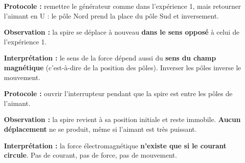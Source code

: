 \documentclass[11pt]{article}
\begin{document}
\begin{experience}
\textbf{Protocole :} remettre le générateur comme dans l'expérience 1, mais retourner l'aimant en U : le pôle Nord prend la place du pôle Sud et inversement.

\textbf{Observation :} la spire se déplace à nouveau \textbf{dans le sens opposé} à celui de l'expérience 1.

\textbf{Interprétation :} le sens de la force dépend aussi du \textbf{sens du champ magnétique} (c'est-à-dire de la position des pôles). Inverser les pôles inverse le mouvement.
\end{experience}

\begin{experience}
\textbf{Protocole :} ouvrir l'interrupteur pendant que la spire est entre les pôles de l'aimant.

\textbf{Observation :} la spire revient à sa position initiale et reste immobile. \textbf{Aucun déplacement} ne se produit, même si l'aimant est très puissant.

\textbf{Interprétation :} la force électromagnétique \textbf{n'existe que si le courant circule}. Pas de courant, pas de force, pas de mouvement.
\end{experience}
\end{document}
